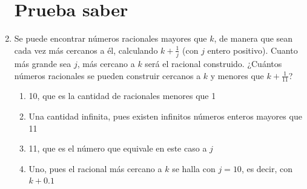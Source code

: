 \documentclass[fleqn]{article}
\begin{document}
\begin{enumerate}
  \section*{Prueba saber}
 \item Se puede encontrar números racionales mayores que $k$, de manera que sean cada vez más cercanos a él, calculando $k +\frac{1}{j}$ (con $j$ entero positivo). Cuanto más grande sea $j$, más cercano a $k$ será el racional construido. ¿Cuántos números racionales se pueden construir cercanos a $k$ y menores que $k + \frac{1}{11}$?
\begin{enumerate}
\item 10, que es la cantidad de racionales menores que 1
\item Una cantidad infinita, pues existen infinitos números enteros mayores que 11
\item 11, que es el número que equivale en este caso a $j$
\item Uno, pues el racional más cercano a $k$ se halla con $j=10$, es decir, con $k+0.1$
\end{enumerate}
 \end{enumerate}
\end{document}
